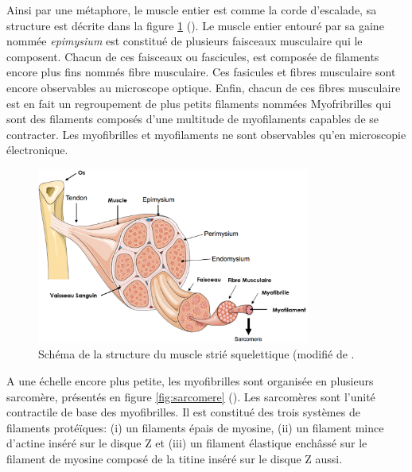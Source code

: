 Ainsi par une métaphore, le muscle entier est comme la corde d'escalade, sa structure est décrite dans la figure \ref{fig:muscle_struct} (\cite{burr_basic_2019}). Le muscle entier entouré par sa gaine nommée \textit{epimysium} est constitué de plusieurs faisceaux musculaire qui le composent. Chacun de ces faisceaux ou fascicules, est composée de filaments encore plus fins nommés fibre musculaire. Ces fasicules et fibres musculaire sont encore observables au microscope optique. Enfin, chacun de ces fibres musculaire est en fait un regroupement de plus petits filaments nommées Myofribrilles qui  sont des filaments composés d'une multitude de myofilaments capables de se contracter. Les myofibrilles et myofilaments ne sont observables qu'en microscopie électronique.

\begin{figure}[!ht]
 \centering
 \includegraphics[width=0.8\textwidth]{figures/muscle.png}
 \caption[Schéma de la structure du muscle strié squelettique (modifié de \cite{burr_basic_2019}]{Schéma de la structure du muscle strié squelettique (modifié de \cite{burr_basic_2019}.}
 \label{fig:muscle_struct}
\end{figure}
A une échelle encore plus petite, les myofibrilles sont organisée en plusieurs sarcomère, présentés en figure \ref{fig:sarcomere} (\cite{burr_basic_2019}). Les sarcomères sont l'unité contractile de base des myofibrilles. Il est constitué des trois systèmes de filaments protéïques: (i) un filaments épais de myosine, (ii) un filament mince d'actine inséré sur le disque Z et (iii) un filament élastique enchâssé sur le filament de myosine composé de la titine inséré sur le disque Z aussi.

